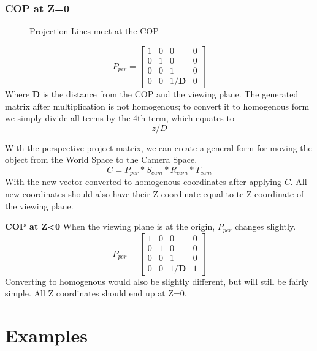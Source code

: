 \subsubsection{COP at Z=0}
\begin{figure}[!htb]
	\caption{\label{fig:trianglesZ0} Projection Lines meet at the COP}
\end{figure}
\begin{equation}
\label{eqn:proj0}
P_{per} = \begin{bmatrix}
1 & 0 & 0 & 0\\ 
0 & 1 & 0 & 0\\ 
0 & 0 & 1 & 0\\
0 & 0 & 1/\mathbf{D} & 0 
\end{bmatrix}
\end{equation}
Where \textbf{D} is the distance from the COP and the viewing plane. The generated matrix after multiplication is not homogenous; to convert it to homogenous form we simply divide all terms by the 4th term, which equates to \[z/D\]

With the perspective project matrix, we can create a general form for moving the object from the World Space to the Camera Space.
\begin{equation}
\label{eqn:worldToCam1}
C = P_{per} * S_{cam} * R_{cam} * T_{cam}
\end{equation}
With the new vector converted to homogenous coordinates after applying $C$.
All new coordinates should also have their Z coordinate equal to te Z coordinate of the viewing plane.

\textbf{COP at Z<0}
When the viewing plane is at the origin, $P_{per}$ changes slightly.
\begin{equation}
\label{eqn:proj1}
P_{per} = \begin{bmatrix}
1 & 0 & 0 & 0\\ 
0 & 1 & 0 & 0\\ 
0 & 0 & 1 & 0\\
0 & 0 & 1/\mathbf{D} & 1 
\end{bmatrix}
\end{equation}
Converting to homogenous would also be slightly different, but will still be fairly simple.
All Z coordinates should end up at Z=0.

\section{Examples}

